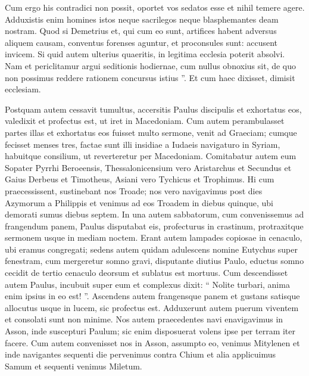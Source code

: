 \begin{biblechapter}
\begin{biblechapter}
\begin{biblechapter}
\begin{biblechapter}
\begin{biblechapter}
\begin{biblechapter}
\begin{biblechapter}
\begin{biblechapter}
\begin{biblechapter}
\begin{biblechapter}
\begin{biblechapter}
\begin{biblechapter}
\begin{biblechapter}
\begin{biblechapter}
\begin{biblechapter}
\begin{biblechapter}
\begin{biblechapter}
\begin{biblechapter}
\begin{biblechapter}
\verse Cum ergo his contradici non possit, oportet vos sedatos esse et nihil temere agere. 
\verse Adduxistis enim homines istos neque sacrilegos neque blasphemantes deam nostram. 
\verse Quod si Demetrius et, qui cum eo sunt, artifices habent adversus aliquem causam, conventus forenses aguntur, et proconsules sunt: accusent invicem. 
 \verse Si quid autem ulterius quaeritis, in legitima ecclesia poterit absolvi. 
 \verse Nam et periclitamur argui seditionis hodiernae, cum nullus obnoxius sit, de quo non possimus reddere rationem concursus istius ”. Et cum haec dixisset, dimisit ecclesiam.
 
\begin{biblechapter}
\verse Postquam autem cessavit tumultus, accersitis Paulus discipulis et exhortatus eos, valedixit et profectus est, ut iret in Macedoniam. 
\verse Cum autem perambulasset partes illas et exhortatus eos fuisset multo sermone, venit ad Graeciam; 
\verse cumque fecisset menses tres, factae sunt illi insidiae a Iudaeis navigaturo in Syriam, habuitque consilium, ut reverteretur per Macedoniam. 
\verse Comitabatur autem eum Sopater Pyrrhi Beroeensis, Thessalonicensium vero Aristarchus et Secundus et Gaius Derbeus et Timotheus, Asiani vero Tychicus et Trophimus. 
\verse Hi cum praecessissent, sustinebant nos Troade; 
\verse nos vero navigavimus post dies Azymorum a Philippis et venimus ad eos Troadem in diebus quinque, ubi demorati sumus diebus septem.
 \verse In una autem sabbatorum, cum convenissemus ad frangendum panem, Paulus disputabat eis, profecturus in crastinum, protraxitque sermonem usque in mediam noctem. 
\verse Erant autem lampades copiosae in cenaculo, ubi eramus congregati; 
 \verse sedens autem quidam adulescens nomine Eutychus super fenestram, cum mergeretur somno gravi, disputante diutius Paulo, eductus somno cecidit de tertio cenaculo deorsum et sublatus est mortuus. 
\verse Cum descendisset autem Paulus, incubuit super eum et complexus dixit: “ Nolite turbari, anima enim ipsius in eo est! ”. 
 \verse Ascendens autem frangensque panem et gustans satisque allocutus usque in lucem, sic profectus est. 
\verse Adduxerunt autem puerum viventem et consolati sunt non minime.
 \verse Nos autem praecedentes navi enavigavimus in Asson, inde suscepturi Paulum; sic enim disposuerat volens ipse per terram iter facere. 
\verse Cum autem convenisset nos in Asson, assumpto eo, venimus Mitylenen 
\verse et inde navigantes sequenti die pervenimus contra Chium et alia applicuimus Samum et sequenti venimus Miletum. 

\end{biblechapter}
\end{biblechapter}
\end{biblechapter}
\end{biblechapter}
\end{biblechapter}
\end{biblechapter}
\end{biblechapter}
\end{biblechapter}
\end{biblechapter}
\end{biblechapter}
\end{biblechapter}
\end{biblechapter}
\end{biblechapter}
\end{biblechapter}
\end{biblechapter}
\end{biblechapter}
\end{biblechapter}
\end{biblechapter}
\end{biblechapter}
\end{biblechapter}
